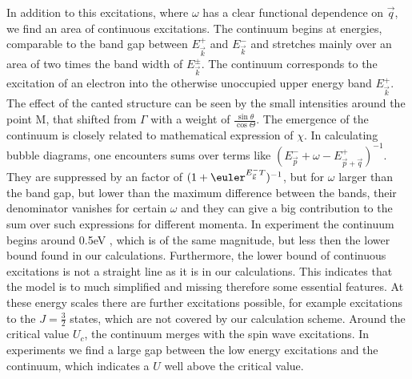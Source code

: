 In addition to this excitations, where $\omega$ has a clear functional dependence on $\vec q$, 
we find an area of continuous excitations.
The continuum begins at energies, comparable to the band gap between $E^+_{\vec k}$ and $E^-_{\vec k}$ and 
stretches mainly over an area of two times the band width of $E^{\pm}_{\vec k}$.
The continuum corresponds to the excitation of an electron into the otherwise unoccupied upper energy band $E^+_{\vec k}$.
The effect of the canted structure can be seen by the small intensities around the point M, that  shifted  from $\Gamma$ with 
a weight of $\frac{\sin \theta}{\cos \Theta}$.
The emergence of the continuum is closely related to mathematical expression of $\chi$. 
In calculating bubble diagrams, one encounters sums over terms like $(E^{-}_{\vec p} +\omega - E^+_{\vec p + \vec q})^{-1}$.
They are suppressed by an factor of $(1+\euler^{E^-_{\vec k} T})^{-1}$, but
for $\omega$ larger than the band gap, but lower than the maximum difference between the bands, their denominator vanishes for certain $\omega$ 
and they can give a big contribution to the sum over such expressions for different momenta. 
In experiment the continuum begins around 0.5eV \cite{PhysRevLett.86.5377}, which is of the same magnitude, but less then the lower bound found in our calculations.
Furthermore, the lower bound of continuous excitations is not a straight line as it is in our calculations. 
This indicates that the model is to much simplified and missing therefore some essential features.
At these energy scales there are further excitations possible, for example excitations to the $J=\frac32$ states, which are not covered by our calculation scheme.
Around the critical value $U_c$, the continuum merges with the spin wave excitations. 
In experiments we find a large gap between the low energy excitations and the continuum, which indicates a $U$ well above the critical value. 

